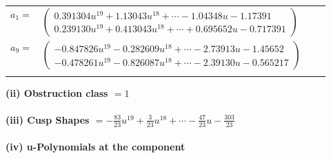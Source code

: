 \documentclass[1p]{elsarticle_modified}
\theoremstyle{definition}
\begin{document}
\begin{tabular}{m{7pt} m{180pt} m{7pt} m{180pt} }
\flushright $a_{1}=$&$\begin{pmatrix}0.391304 u^{19}+1.13043 u^{18}+\cdots-1.04348 u-1.17391\\0.239130 u^{19}+0.413043 u^{18}+\cdots+0.695652 u-0.717391\end{pmatrix}$ \\
\flushright $a_{9}=$&$\begin{pmatrix}-0.847826 u^{19}-0.282609 u^{18}+\cdots-2.73913 u-1.45652\\-0.478261 u^{19}-0.826087 u^{18}+\cdots-2.39130 u-0.565217\end{pmatrix}$\\&\end{tabular}
\flushleft \textbf{(ii) Obstruction class $= 1$}\\~\\
\flushleft \textbf{(iii) Cusp Shapes $= -\frac{83}{23} u^{19}+\frac{3}{23} u^{18}+\cdots-\frac{47}{23} u-\frac{303}{23}$}\\~\\
\newpage\renewcommand{\arraystretch}{1}
\flushleft \textbf{(iv) u-Polynomials at the component}\newline \\
\end{document}
